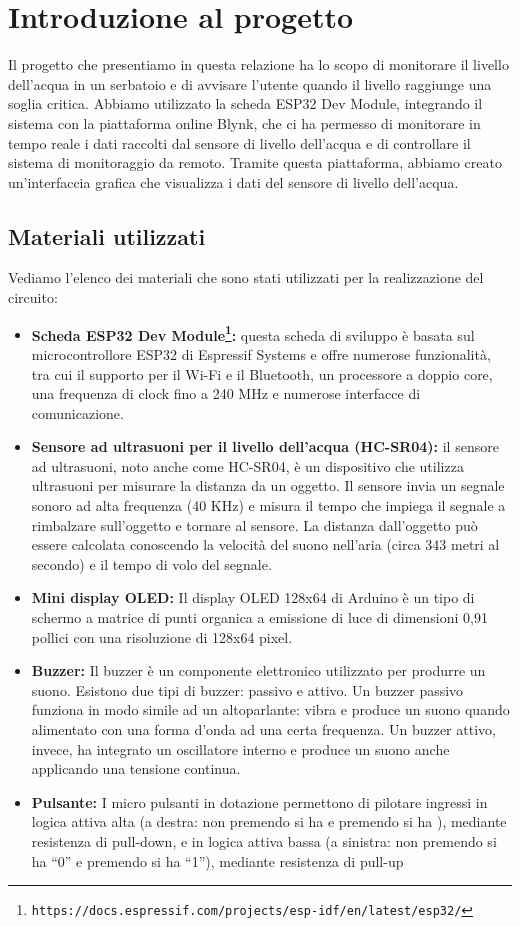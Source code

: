\section{Introduzione al progetto}

Il progetto che presentiamo in questa relazione ha lo scopo di monitorare il livello dell'acqua in un serbatoio e di avvisare l'utente quando il livello raggiunge una soglia critica. Abbiamo utilizzato la scheda ESP32 Dev Module, integrando il sistema con la piattaforma online Blynk, che ci ha permesso di monitorare in tempo reale i dati raccolti dal sensore di livello dell'acqua e di controllare il sistema di monitoraggio da remoto. Tramite questa piattaforma, abbiamo creato un'interfaccia grafica che visualizza i dati del sensore di livello dell'acqua.    

\subsection{Materiali utilizzati}
Vediamo l'elenco dei materiali che sono stati utilizzati per la realizzazione del circuito:
\begin{itemize}
    \item \textbf{Scheda ESP32 Dev Module\footnote{\texttt{https://docs.espressif.com/projects/esp-idf/en/latest/esp32/}}:} questa scheda di sviluppo è basata sul microcontrollore ESP32 di Espressif Systems e offre numerose funzionalità, tra cui il supporto per il Wi-Fi e il Bluetooth, un processore a doppio core, una frequenza di clock fino a 240 MHz e numerose interfacce di comunicazione.
    \item \textbf{Sensore ad ultrasuoni per il livello dell'acqua (HC-SR04):} il sensore ad ultrasuoni, noto anche come HC-SR04, è un dispositivo che utilizza ultrasuoni per misurare la distanza da un oggetto. Il sensore invia un segnale sonoro ad alta frequenza (40 KHz) e misura il tempo che impiega il segnale a rimbalzare sull'oggetto e tornare al sensore. La distanza dall'oggetto può essere calcolata conoscendo la velocità del suono nell'aria (circa 343 metri al secondo) e il tempo di volo del segnale. 
    \item \textbf{Mini display OLED:} Il display OLED 128x64 di Arduino è un tipo di schermo a matrice di punti organica a emissione di luce di dimensioni 0,91 pollici con una risoluzione di 128x64 pixel.
    \item \textbf{Buzzer:} Il buzzer è un componente elettronico utilizzato per produrre un suono. Esistono due tipi di buzzer: passivo e attivo. Un buzzer passivo funziona in modo simile ad un altoparlante: vibra e produce un suono quando alimentato con una forma d'onda ad una certa frequenza. Un buzzer attivo, invece, ha integrato un oscillatore interno e produce un suono anche applicando una tensione continua.
    \item \textbf{Pulsante:} I micro pulsanti in dotazione permettono di pilotare ingressi in logica attiva alta (a destra: non premendo si ha  e premendo si ha ), mediante resistenza di pull-down, e in logica attiva bassa (a sinistra: non premendo si ha “0” e premendo si ha “1”), mediante resistenza di pull-up
\end{itemize}

